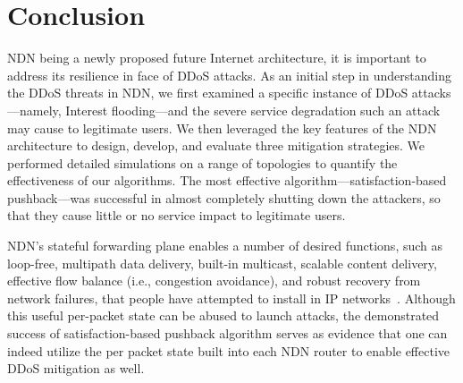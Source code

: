 \section{Conclusion}
\label{sec:conclusion}


%
%

NDN being a newly proposed future Internet architecture, it is important to address its resilience in face of DDoS attacks. As an initial step in understanding the DDoS threats in NDN, we first examined a specific instance of DDoS attacks---namely, Interest flooding---and the severe service degradation such an attack may cause to legitimate users. We then leveraged the key features of the NDN architecture to design, develop, and evaluate three mitigation strategies.
We performed detailed simulations on a range of topologies to quantify the effectiveness of our algorithms.   
The most effective algorithm---satisfaction-based pushback---was successful in almost completely shutting down the attackers, so that they cause little or no service impact to legitimate users.

NDN's stateful forwarding plane enables a number of desired functions, such as loop-free, multipath data delivery, built-in multicast, scalable content delivery, effective flow balance (i.e., congestion avoidance), and robust recovery from network failures, that people have attempted to install in IP networks~\cite{adaptive-forwarding,Yi:2013:A-Case-for-Stateful}. Although this useful per-packet state can be abused to launch attacks, the demonstrated success of satisfaction-based pushback algorithm serves as evidence that one can indeed utilize the per packet state built into each NDN router to enable effective DDoS mitigation as well.  
